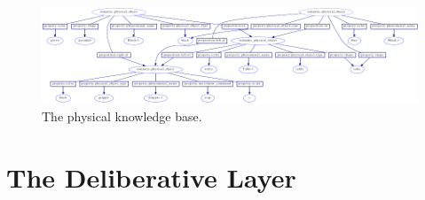 \begin{figure}
\begin{center}
\includegraphics[width=8.5in]{gfx/implemented_physical_knowledge}
\end{center}
\hspace{4cm}\parbox{15cm}{\caption[The physical knowledge base.]{The
    physical
    knowledge base.}\label{figure:implemented_physical_knowledge}}
\end{figure}

\section{The Deliberative Layer}

